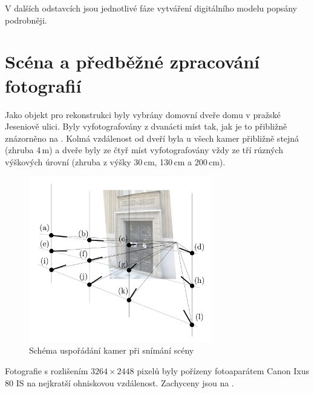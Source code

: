 \documentclass[11pt,oneside,a4paper,pdftex]{article}   %
\begin{document}
V dalších odstavcích jsou jednotlivé fáze vytváření digitálního modelu popsány podrobněji.

\section{Scéna a předběžné zpracování fotografií}

Jako objekt pro rekonstrukci byly vybrány domovní dveře domu v pražské Jeseniově ulici. Byly
vyfotografovány z dvanácti míst tak, jak je to přibližně znázorněno na .
Kolmá vzdálenost od dveří byla u všech kamer přibližně stejná (zhruba 4\,m) a dveře byly ze čtyř
míst vyfotografovány vždy ze tří rúzných výškových úrovní (zhruba z výšky 30\,cm, 130\,cm a
200\,cm).
	\begin{figure}[htb]
		\centering
		\includegraphics[width=8cm]{pictures/usporadani_kamer.pdf}
		\caption{Schéma uspořádání kamer při snímání scény}
		\label{fig:usporadaniKamer}
	\end{figure}
Fotografie s rozlišením $3264\times2448$ pixelů byly pořízeny fotoaparátem Canon Ixus 80
IS na nejkratší ohniskovou vzdálenost. Zachyceny jsou na .
\end{document}
